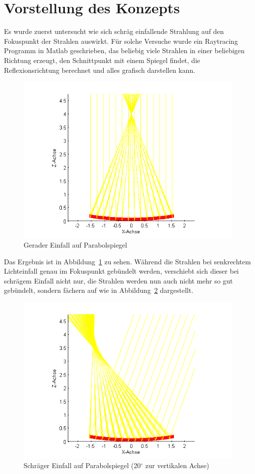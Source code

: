 \documentclass[fontsize=10pt,paper=a4,bibliography=totoc]{scrartcl}
\begin{document}
\section{Vorstellung des Konzepts}
Es wurde zuerst untersucht wie sich schräg einfallende Strahlung auf den Fokuspunkt der Strahlen auswirkt. Für solche Versuche wurde ein Raytracing Programm in Matlab geschrieben, das beliebig viele Strahlen in einer beliebigen Richtung erzeugt, den Schnittpunkt mit einem Spiegel findet, die Reflexionsrichtung berechnet und alles grafisch darstellen kann. 
\begin{figure}[htb]
	\centering
	\includegraphics[width=\textwidth]{images/2d_gerade}
	\caption{Gerader Einfall auf Parabolspiegel}
	\label{pic:2dreflektion}
\end{figure}
Das Ergebnis ist in Abbildung~\ref{pic:2dreflektion} zu sehen. Während die Strahlen bei senkrechtem Lichteinfall genau im Fokuspunkt gebündelt werden, verschiebt sich dieser
bei schrägem Einfall nicht nur, die Strahlen werden nun auch nicht mehr so gut gebündelt, sondern fächern auf wie in Abbildung~\ref{pic:2dreflektion_schraeg} dargestellt. 
\begin{figure}[htb]
	\centering
	\includegraphics[width=\textwidth]{images/2d_schraeg_20_grad}
	\caption{Schräger Einfall auf Parabolspiegel (20$^{\circ}$ zur vertikalen Achse)}
	\label{pic:2dreflektion_schraeg}
\end{figure}
\end{document}
